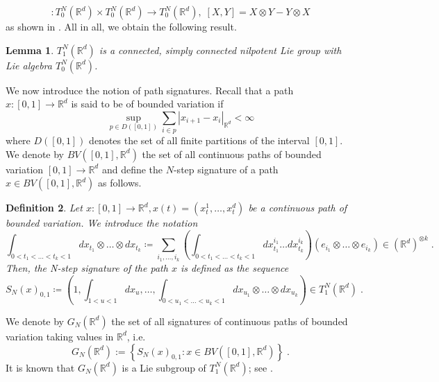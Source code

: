 \documentclass[pdflatex,sn-mathphys-num]{sn-jnl}
\theoremstyle{thmstyletwo}
\newtheorem{definition}{Definition}[section]
\theoremstyle{thmstyleone}
\newtheorem{lemma}[definition]{Lemma}
\theoremstyle{thmstyletwo}
\newcommand{\R}{\mathbb{R}}
\begin{document}
	\begin{equation*}
		[\cdot, \cdot]: T_0^N\left(\mathbb{R}^d\right) \times T_0^N\left(\mathbb{R}^d\right) \to T_0^N\left(\mathbb{R}^d\right), \; [X,Y] = X \otimes Y - Y \otimes X
	\end{equation*}
	as shown in \cite[Proposition 7.19]{friz2010multidimensional}. All in all, we obtain the following result.
	\begin{lemma}
		$T_1^N\left(\mathbb{R}^d\right)$ is a connected, simply connected nilpotent Lie group with Lie algebra $T_0^N\left(\mathbb{R}^d\right)$.
	\end{lemma}
	We now introduce the notion of path signatures. Recall that a path $x: [0,1] \to \R^d$ is said to be of bounded variation if
	\begin{equation*}
		\sup_{p\in D([0,1])} \sum_{i\in p} |x_{i+1}-x_i|_{\R^d} <\infty
	\end{equation*}
	where $D([0,1])$ denotes the set of all finite partitions of the interval $[0,1]$. We denote by $BV([0,1],\R^d)$ the set of all continuous paths of bounded variation $[0,1] \to \R^d$ and define the $N$-step signature of a path $x \in BV([0,1],\R^d)$ as follows.
	\begin{definition}
		Let $x: [0,1] \to \mathbb{R}^d, x(t) = (x_t^1, \ldots, x_t^d)$ be a continuous path of bounded variation. We introduce the notation
		\begin{equation*}
			\int_{0 < t_1 < \dots < t_k < 1} dx_{t_1} \otimes \dots \otimes dx_{t_k} \coloneqq \sum_{i_1, \dots, i_k} \left( \int_{0 < t_1 < \dots < t_k < 1} dx_{t_1}^{i_1} \dots dx_{t_k}^{i_k} \right) (e_{i_1} \otimes \dots \otimes e_{i_k})
			\in (\mathbb{R}^d)^{\otimes k} \;.
		\end{equation*}
		Then, the N-step signature of the path $x$ is defined as the sequence
		\begin{equation*}
			S_N(x)_{0,1} \coloneqq\left(1, \int_{1<u<1} d x_u, \ldots, \int_{0<u_1<\ldots<u_k<1} d x_{u_1} \otimes \ldots \otimes d x_{u_k}\right) \in  T_1^N(\R^d) \;.
		\end{equation*}
	\end{definition}
	We denote by $G_N(\R^d)$ the set of all signatures of continuous paths of bounded variation taking values in $\R^d$, i.e.
	\begin{equation}\label{eq: group of signatures definition}
		G_N(\mathbb{R}^d) := \left\{ S_N(x)_{0,1} : x \in BV\left( [0, 1], \mathbb{R}^d \right) \right\} \;.
	\end{equation}
	It is known that $G_N(\mathbb{R}^d)$ is a Lie subgroup of $T_1^N\left(\mathbb{R}^d\right)$; see \cite[Proposition~2.25]{lyons2007roughpaths}.
\end{document}
